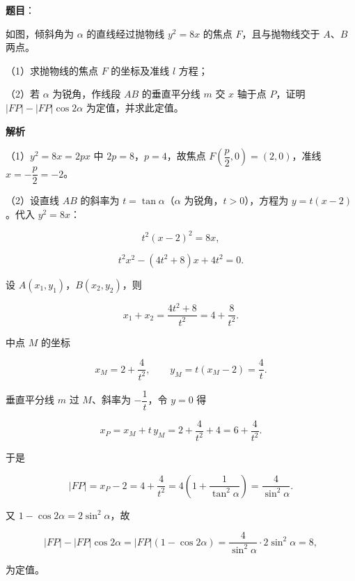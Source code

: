 \begin{answer}

\textbf{题目}：

如图，倾斜角为 $\alpha$ 的直线经过抛物线 $y^2=8x$ 的焦点 $F$，且与抛物线交于 $A$、$B$ 两点。

（1）求抛物线的焦点 $F$ 的坐标及准线 $l$ 方程；

（2）若 $\alpha$ 为锐角，作线段 $AB$ 的垂直平分线 $m$ 交 $x$ 轴于点 $P$，证明 $|FP|-|FP|\cos2\alpha$ 为定值，并求此定值。
\nopagebreak[4]
\begin{center}\end{center}
\nopagebreak[4]
\textbf{解析}

（1）$y^2=8x=2px$ 中 $2p=8$，$p=4$，故焦点 $F\left(\dfrac p2,0\right)=(2,0)$，准线 $x=-\dfrac p2=-2$。

（2）设直线 $AB$ 的斜率为 $t=\tan\alpha$（$\alpha$ 为锐角，$t>0$），方程为 $y=t(x-2)$。代入 $y^2=8x$：

\nopagebreak[4]
\[t^2(x-2)^2=8x,\]

\nopagebreak[4]
\[t^2x^2-(4t^2+8)x+4t^2=0.\]

设 $A(x_1,y_1)$，$B(x_2,y_2)$，则

\nopagebreak[4]
\[x_1+x_2=\frac{4t^2+8}{t^2}=4+\frac8{t^2}.\]

中点 $M$ 的坐标

\nopagebreak[4]
\[x_M=2+\frac4{t^2},\qquad y_M=t(x_M-2)=\frac4t.\]

垂直平分线 $m$ 过 $M$、斜率为 $-\dfrac1t$，令 $y=0$ 得

\nopagebreak[4]
\[x_P=x_M+t\,y_M=2+\frac4{t^2}+4=6+\frac4{t^2}.\]

于是

\nopagebreak[4]
\[|FP|=x_P-2=4+\frac4{t^2}=4\left(1+\frac1{\tan^2\alpha}\right)=\frac4{\sin^2\alpha}.\]

又 $1-\cos2\alpha=2\sin^2\alpha$，故

\nopagebreak[4]
\[|FP|-|FP|\cos2\alpha=|FP|(1-\cos2\alpha)=\frac4{\sin^2\alpha}\cdot2\sin^2\alpha=8,\]

为定值。


\end{answer}

